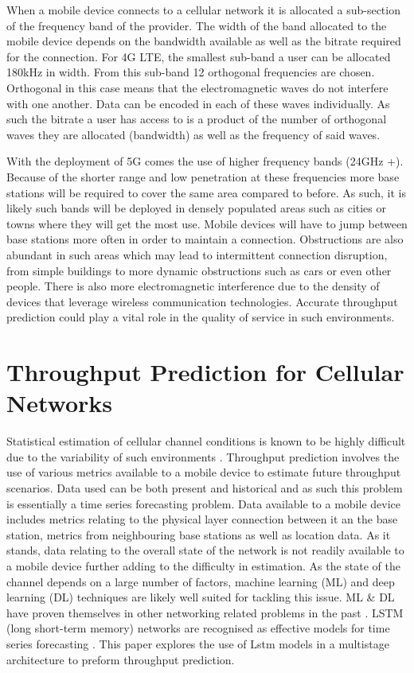 When a mobile device connects to a cellular network it is allocated a sub-section of the frequency band of the provider. The width of the band allocated to the mobile device depends on the bandwidth available as well as the bitrate required for the connection. For 4G LTE, the smallest sub-band a user can be allocated 180kHz in width. From this sub-band 12 orthogonal frequencies are chosen. Orthogonal in this case means that the electromagnetic waves do not interfere with one another. Data can be encoded in each of these waves individually. As such the bitrate a user has access to is a product of the number of orthogonal waves they are allocated (bandwidth) as well as the frequency of said waves.

With the deployment of 5G comes the use of higher frequency bands (24GHz +). Because of the shorter range and low penetration at these frequencies more base stations will be required to cover the same area compared to before. As such, it is likely such bands will be deployed in densely populated areas such as cities or towns where they will get the most use. Mobile devices will have to jump between base stations more often in order to maintain a connection. Obstructions are also abundant in such areas which may lead to intermittent connection disruption, from simple buildings to more dynamic obstructions such as cars or even other people. There is also more electromagnetic interference due to the density of devices that leverage wireless communication technologies. Accurate throughput prediction could play a vital role in the quality of service in such environments.


\section{Throughput Prediction for Cellular Networks}

Statistical estimation of cellular channel conditions is known to be highly difficult due to the variability of such environments \cite{10.1145/2785956.2787498}. Throughput prediction involves the use of various metrics available to a mobile device to estimate future throughput scenarios. Data used can be both present and historical and as such this problem is essentially a time series forecasting problem. Data available to a mobile device includes metrics relating to the physical layer connection between it an the base station, metrics from neighbouring base stations as well as location data. As it stands, data relating to the overall state of the network is not readily available to a mobile device further adding to the difficulty in estimation. As the state of the channel depends on a large number of factors, machine learning (ML) and deep learning (DL) techniques are likely well suited for tackling this issue. ML \& DL have proven themselves in other networking related problems in the past \cite{8666641}. LSTM (long short-term memory) networks are recognised as effective models for time series forecasting \cite{8614252}. This paper explores the use of Lstm models in a multistage architecture to preform throughput prediction.
